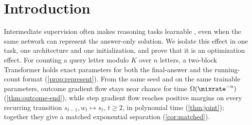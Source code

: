 \begin{abstract}
We prove a learning-time separation between outcome and process supervision in a concrete Transformer. For counting modulo $K$ in a
two-block causal softmax-attention/ReLU Transformer that holds exact executors for both formats, gradient flow from the same small
initialization, on the same trainable parameters, stays near chance for time $\Omega(\mixrate^{-n})$ when trained on the final count, and
reaches positive margins on every recurring transition in time $O(n^{5/2}\log n)$ when trained on the running counts, with the attention routing
fixed. The mechanism is credit contraction: each letter a feature does not read multiplies its correlation with the final count by
$\mixrate<1$, and near initialization the network is built from features that read few letters, whereas a displayed count leaves an
order-one local signal. Experiments drop the theorems' assumptions one at a time, from learned routing to all parameters under AdamW,
other state-tracking tasks and LoRA-tuned Qwen2.5-0.5B; the separation persists at every rung except one object-tracking size.
\end{abstract}

\section{Introduction}
\label{sec:intro}

Intermediate supervision often makes reasoning tasks learnable \citep{nye2021scratchpads,wei2022cot,lightman2023verify}, even when the
same network can represent the answer-only solution. We isolate this effect in one task, one architecture and one initialization, and
prove that it is an optimization effect. For counting a query letter modulo $K$ over $n$ letters, a two-block Transformer holds exact
parameters for both the final-answer and the running-count format (\cref{prop:represent}). From the same seed and on the same trainable
parameters, outcome gradient flow stays near chance for time $\Omega(\mixrate^{-n})$ (\cref{thm:outcome-end}), while step gradient flow
reaches positive margins on every recurring transition $s_{t-1},w_t\mapsto s_t$, $t\ge2$, in polynomial time (\cref{thm:joint}); together they give a matched exponential separation
(\cref{cor:matched}).

